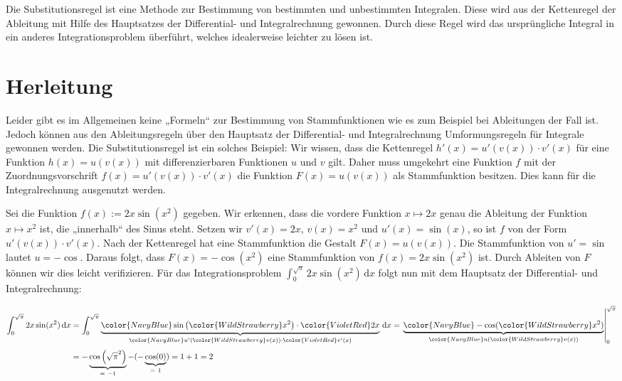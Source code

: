 \documentclass[fontsize=9pt,
               parskip=half-,
               DIV=14,
               listof=chapterentry,
               tocflat]{scrbook}
\begin{document}
Die Substitutionsregel ist eine Methode zur Bestimmung von bestimmten und unbestimmten Integralen. Diese wird aus der Kettenregel der Ableitung mit Hilfe des Hauptsatzes der Differential- und Integralrechnung gewonnen. Durch diese Regel wird das ursprüngliche Integral in ein anderes Integrationsproblem überführt, welches idealerweise leichter zu lösen ist.

\section{Herleitung}

Leider gibt es im Allgemeinen keine „Formeln“ zur Bestimmung von Stammfunktionen wie es zum Beispiel bei Ableitungen der Fall ist. Jedoch können aus den Ableitungsregeln über den Hauptsatz der Differential- und Integralrechnung Umformungsregeln für Integrale gewonnen werden. Die Substitutionsregel ist ein solches Beispiel: Wir wissen, dass die Kettenregel $h'(x)=u'(v(x))\cdot v'(x)$ für eine Funktion $h(x)=u(v(x))$ mit differenzierbaren Funktionen $u$ und $v$ gilt. Daher muss umgekehrt eine Funktion $f$ mit der Zuordnungsvorschrift $f(x)=u'(v(x))\cdot v'(x)$ die Funktion $F(x)=u(v(x))$ als Stammfunktion besitzen. Dies kann für die Integralrechnung ausgenutzt werden.

\begin{example*}
Sei die Funktion $f(x):=2x\sin(x^{2})$ gegeben. Wir erkennen, dass die vordere Funktion $x\mapsto 2x$ genau die Ableitung der Funktion $x\mapsto x^{2}$ ist, die „innerhalb“ des Sinus steht. Setzen wir $v'(x)=2x$, $v(x)=x^{2}$ und $u'(x)=\sin(x)$, so ist $f$ von der Form $u'(v(x))\cdot v'(x)$. Nach der Kettenregel hat eine Stammfunktion die Gestalt $F(x)=u(v(x))$. Die Stammfunktion von $u'=\sin $ lautet $u=-\cos $. Daraus folgt, dass $F(x)=-\cos(x^{2})$ eine Stammfunktion von $f(x)=2x\sin(x^{2})$ ist. Durch Ableiten von $F$ können wir dies leicht verifizieren. Für das Integrationsproblem $\int _{0}^{\sqrt {\pi }}2x\sin(x^{2})\,\mathrm {d} x$ folgt nun mit dem Hauptsatz der Differential- und Integralrechnung:

\begin{align*}
\int _{0}^{\sqrt {\pi }}2x\sin(x^{2})\,\mathrm {d} x&=\int _{0}^{\sqrt {\pi }}\underbrace {{\color {NavyBlue}\sin \left({\color {WildStrawberry}x^{2}}\right)}\cdot {\color {VioletRed}2x}} _{{\color {NavyBlue}u'({\color {WildStrawberry}v(x)})}\cdot {\color {VioletRed}v'(x)}}\,\mathrm {d} x=\left.\underbrace {\color {NavyBlue}-\cos({\color {WildStrawberry}x^{2}})} _{\color {NavyBlue}u({\color {WildStrawberry}v(x)})}\right|_{0}^{\sqrt {\pi }}\\[0.3em]&=-\underbrace {\cos \left({\sqrt {\pi }}^{2}\right)} _{=\ -1}-(-\underbrace {\cos(0)} _{=\ 1})=1+1=2
\end{align*}

\end{example*}
\end{document}

